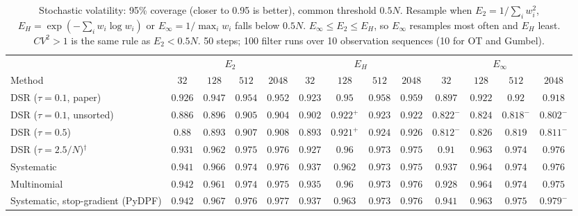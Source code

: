 \begin{table}[ht]
\centering
\small
\caption{Stochastic volatility: 95\% coverage (closer to 0.95 is better), common threshold $0.5N$. Resample when $E_2=1/\sum_iw_i^2$, $E_H=\exp(-\sum_iw_i\log w_i)$ or $E_\infty=1/\max_iw_i$ falls below $0.5N$. $E_\infty\le E_2\le E_H$, so $E_\infty$ resamples most often and $E_H$ least. $CV^2>1$ is the same rule as $E_2<0.5N$. 50 steps; 100 filter runs over 10 observation sequences (10 for OT and Gumbel).}
\label{tab:trigger-fixed-volatility-coverage95}
\begin{adjustbox}{max width=\linewidth}
\begin{tabular}{lcccc|cccc|cccc}
\toprule
 & \multicolumn{4}{c}{$E_2$} & \multicolumn{4}{c}{$E_H$} & \multicolumn{4}{c}{$E_\infty$} \\
\cmidrule(lr){2-5} \cmidrule(lr){6-9} \cmidrule(lr){10-13}
Method & $32$ & $128$ & $512$ & $2048$ & $32$ & $128$ & $512$ & $2048$ & $32$ & $128$ & $512$ & $2048$ \\
\midrule
DSR ($\tau{=}0.1$, paper) & $\mathbf{0.926}$ & $0.947$ & $\mathbf{0.954}$ & $\mathbf{0.952}$ & $0.923$ & $\mathbf{0.95}$ & $0.958$ & $0.959$ & $0.897$ & $0.922$ & $0.92$ & $0.918$ \\
DSR ($\tau{=}0.1$, unsorted) & $0.886$ & $0.896$ & $0.905$ & $0.904$ & $\mathbf{0.902}$ & $\mathbf{0.922}^{+}$ & $\mathbf{0.923}$ & $\mathbf{0.922}$ & $0.822^{-}$ & $0.824$ & $0.818^{-}$ & $0.802^{-}$ \\
DSR ($\tau{=}0.5$) & $0.88$ & $0.893$ & $0.907$ & $0.908$ & $\mathbf{0.893}$ & $\mathbf{0.921}^{+}$ & $\mathbf{0.924}$ & $\mathbf{0.926}$ & $0.812^{-}$ & $0.826$ & $0.819$ & $0.811^{-}$ \\
DSR ($\tau{=}2.5/N$)$^\dagger$ & $\mathbf{0.931}$ & $0.962$ & $0.975$ & $0.976$ & $0.927$ & $\mathbf{0.96}$ & $\mathbf{0.973}$ & $\mathbf{0.975}$ & $0.91$ & $0.963$ & $0.974$ & $0.976$ \\
\midrule
Systematic & $\mathbf{0.941}$ & $0.966$ & $0.974$ & $0.976$ & $0.937$ & $\mathbf{0.962}$ & $\mathbf{0.973}$ & $\mathbf{0.975}$ & $0.937$ & $0.964$ & $0.974$ & $0.976$ \\
Multinomial & $\mathbf{0.942}$ & $0.961$ & $0.974$ & $\mathbf{0.975}$ & $0.935$ & $\mathbf{0.96}$ & $\mathbf{0.973}$ & $0.976$ & $0.928$ & $0.964$ & $0.974$ & $0.975$ \\
Systematic, stop-gradient (PyDPF) & $\mathbf{0.942}$ & $0.967$ & $0.976$ & $0.977$ & $0.937$ & $\mathbf{0.963}$ & $\mathbf{0.973}$ & $\mathbf{0.976}$ & $0.941$ & $\mathbf{0.963}$ & $0.975$ & $0.979^{-}$ \\

\end{tabular}
\end{adjustbox}
\end{table}
